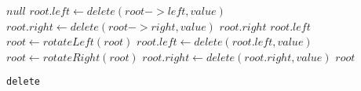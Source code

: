 \begin{algorithm}
  \DontPrintSemicolon

  
    {
      \Return $null$\;
    }
  {
     $root.left \leftarrow delete(root->left, value)$\;
  }
  {
     $root.right \leftarrow delete(root->right, value)$\;
  }
  {
  	{
  	  \Return $root.right$\;
  	}
  	{
  	  \Return $root.left$\;
  	}
  	{
  	  $root \leftarrow rotateLeft(root)$\;
  	  $root.left \leftarrow delete(root.left, value)$\;
  	}
  	\Else
  	{
  	  $root \leftarrow rotateRight(root)$\;
  	  $root.right \leftarrow delete(root.right, value)$\;
  	}
  }
  \Return $root$\;
  \caption{\texttt{delete}}
  \label{treap-delete}
\end{algorithm}
